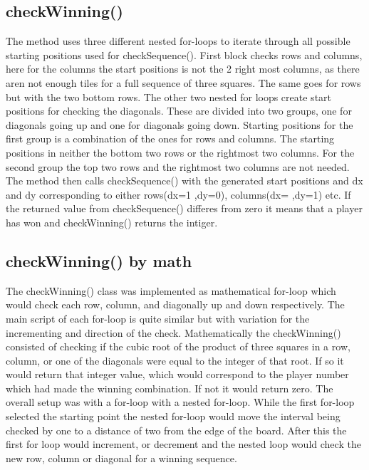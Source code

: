 \documentclass[a4paper,10pt]{article}
\begin{document}
\subsection{checkWinning()} 
The method uses three different nested for-loops to iterate through all possible starting positions used for checkSequence(). First block checks rows and columns, here for the columns the start positions is not the 2 right most columns, as there aren not enough tiles for a full sequence of three squares. The same goes for rows but  with the two bottom  rows. 
The other two nested for loops create start positions for checking the diagonals. These are divided into two groups, one for diagonals going up and  one for diagonals going down. Starting positions for the first group is a combination of the ones for rows and columns. The starting positions in neither the bottom two rows or the rightmost two columns. For the second group the top two rows and the rightmost two columns are not needed.
The method then calls checkSequence() with the generated start positions and dx and dy corresponding to either rows(dx=1 ,dy=0), columns(dx= ,dy=1) etc.
If the returned value from checkSequence() differes from zero it means that a player has won and checkWinning() returns the intiger.

\subsection{checkWinning() by math}
 The checkWinning() class was implemented as mathematical for-loop which would check each row, column, and diagonally up and down respectively. The main script of each for-loop is quite similar but with  variation for the incrementing and direction of the check. 
 Mathematically the checkWinning() consisted of checking if the cubic root of the product of three squares in a row, column, or one of the diagonals were equal to the integer of that root. If so it would return that integer value, which would correspond to the player number which had made the winning combination. If not it would return zero.  
 The overall setup was with a for-loop with a nested for-loop. While the first for-loop selected the starting point the nested for-loop would move the interval being checked by one to a distance of two from the edge of the board. After this the first for loop would increment, or decrement and the nested loop would check the new row, column or diagonal for a winning sequence.
\end{document}
